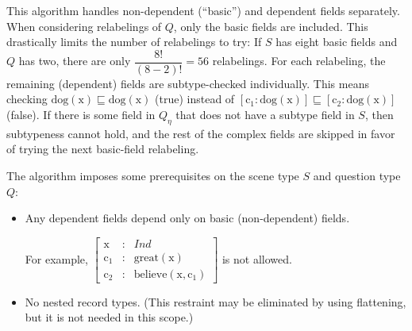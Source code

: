 This algorithm handles non-dependent (``basic'') and dependent fields separately.
When considering relabelings of $Q$, only the basic fields are included.
This drastically limits the number of relabelings to try:
If $S$ has eight basic fields and $Q$ has two, there are only $\dfrac{8!}{(8-2)!} = 56$ relabelings.
For each relabeling, the remaining (dependent) fields are subtype-checked individually.
This means checking
$\text{dog}(\text{x}) \sqsubseteq \text{dog}(\text{x})$ (true) instead of
$[\text{c}_1 : \text{dog}(\text{x})] \sqsubseteq [\text{c}_2 : \text{dog}(\text{x})]$ (false).
If there is some field in $Q_\eta$ that does not have a subtype field in $S$, then subtypeness cannot hold, and the rest of the complex fields are skipped in favor of trying the next basic-field relabeling.


The algorithm imposes some prerequisites on the scene type $S$ and question type $Q$:

\begin{itemize}
\item Any dependent fields depend only on basic (non-dependent) fields.

For example, $\left[\begin{array}{rcl}
\text{x} &:& Ind \\
\text{c}_1 &:& \text{great}(\text{x}) \\
\text{c}_2 &:& \text{believe}(\text{x}, \text{c}_1)
\end{array}\right]$ is not allowed.

\item No nested record types.
(This restraint may be eliminated by using flattening, but it is not needed in this scope.)
\end{itemize}

